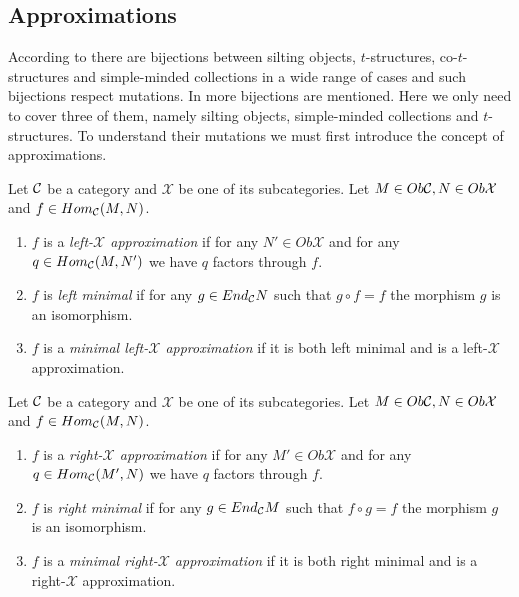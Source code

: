 \subsection{Approximations}
\indent According to \cite{KY12} there are bijections between silting objects, $t$-structures, co-$t$-structures and simple-minded collections in a wide range of cases and such bijections respect mutations. In \cite{BY13} more bijections are mentioned. Here we only need to cover three of them, namely silting objects, simple-minded collections and $t$-structures. To understand their mutations we must first introduce the concept of approximations.\\
\begin{definition}
Let $\mathcal{C}$ be a category and $\mathcal{X}$ be one of its subcategories. Let $M\in Ob\mathcal{C}, N\in Ob\mathcal{X}$ and $f\in Hom_{\mathcal{C}}(M,N)$.
\begin{enumerate}
\item $f$ is a \textit{left-$\mathcal{X}$ approximation} if for any $N'\in Ob\mathcal{X}$ and for any $q\in Hom_{\mathcal{C}}(M,N')$ we have $q$ factors through $f$.
\item $f$ is \textit{left minimal} if for any $g\in End_{\mathcal{C}} N$ such that $g\circ f = f$ the morphism $g$ is an isomorphism.
\item $f$ is a \textit{minimal left-$\mathcal{X}$ approximation} if it is both left minimal and is a left-$\mathcal{X}$ approximation.
\end{enumerate}
\end{definition}
\begin{definition}
Let $\mathcal{C}$ be a category and $\mathcal{X}$ be one of its subcategories. Let $M\in Ob\mathcal{C}, N\in Ob\mathcal{X}$ and $f\in Hom_{\mathcal{C}}(M,N)$.
\begin{enumerate}
\item $f$ is a \textit{right-$\mathcal{X}$ approximation} if for any $M'\in Ob\mathcal{X}$ and for any $q\in Hom_{\mathcal{C}}(M',N)$ we have $q$ factors through $f$.
\item $f$ is \textit{right minimal} if for any $g\in End_{\mathcal{C}} M$ such that $f\circ g = f$ the morphism $g$ is an isomorphism.
\item $f$ is a \textit{minimal right-$\mathcal{X}$ approximation} if it is both right minimal and is a right-$\mathcal{X}$ approximation.
\end{enumerate}
\end{definition}
